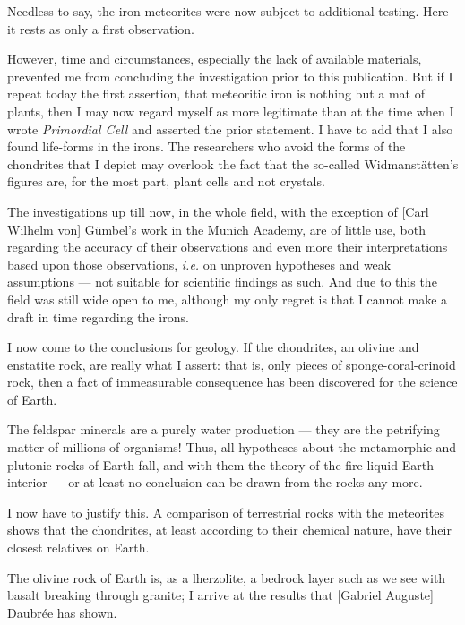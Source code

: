 \documentclass[a4paper, 12pt, oneside]{article}
\begin{document}
Needless to say, the iron meteorites were now subject to additional testing. Here it rests as only a first observation.

However, time and circumstances, especially the lack of available materials, prevented me from concluding the investigation prior to this publication. But if I repeat today the first assertion, that meteoritic iron is nothing but a mat of plants, then I may now regard myself as more legitimate than at the time when I wrote \emph{Primordial Cell} and asserted the prior statement. I have to add that I also found life-forms in the irons. The researchers who avoid the forms of the chondrites that I depict may overlook the fact that the so-called Widmanstätten's figures are, for the most part, plant cells and not crystals.

The investigations up till now, in the whole field, with the exception of [Carl Wilhelm von] Gümbel's work in the Munich Academy, are of little use, both regarding the accuracy of their observations and even more their interpretations based upon those observations, \emph{i.e.} on unproven hypotheses and weak assumptions --- not suitable for scientific findings as such. And due to this the field was still wide open to me, although my only regret is that I cannot make a draft in time regarding the irons.

I now come to the conclusions for geology. If the chondrites, an olivine and enstatite rock, are really what I assert: that is, only pieces of sponge-coral-crinoid rock, then a fact of immeasurable consequence has been discovered for the science of Earth.

The feldspar minerals are a purely water production --- they are the petrifying matter of millions of organisms! Thus, all hypotheses about the metamorphic and plutonic rocks of Earth fall, and with them the theory of the fire-liquid Earth interior --- or at least no conclusion can be drawn from the rocks any more.

I now have to justify this. A comparison of terrestrial rocks with the meteorites shows that the chondrites, at least according to their chemical nature, have their closest relatives on Earth.

The olivine rock of Earth is, as a lherzolite, a bedrock layer such as we see with basalt breaking through granite; I arrive at the results that [Gabriel Auguste] Daubrée has shown.
\end{document}
